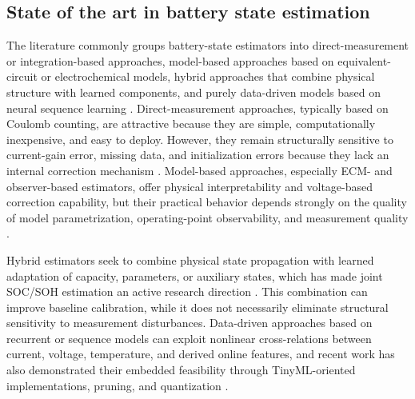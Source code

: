 \documentclass[review,nopreprintline]{elsarticle}
\begin{document}
\subsection{State of the art in battery state estimation}
The literature commonly groups battery-state estimators into direct-measurement or integration-based approaches, model-based approaches based on equivalent-circuit or electrochemical models, hybrid approaches that combine physical structure with learned components, and purely data-driven models based on neural sequence learning \cite{khanComparativeStudyDifferent2022,shrivastavaReviewTechnologicalAdvancement2023,guoSystematicReviewElectrochemical2024,yaoSmarterBatteryManagement2025b}. Direct-measurement approaches, typically based on Coulomb counting, are attractive because they are simple, computationally inexpensive, and easy to deploy. However, they remain structurally sensitive to current-gain error, missing data, and initialization errors because they lack an internal correction mechanism \cite{khanComparativeStudyDifferent2022,liRobustnessSOCEstimation2015}. Model-based approaches, especially ECM- and observer-based estimators, offer physical interpretability and voltage-based correction capability, but their practical behavior depends strongly on the quality of model parametrization, operating-point observability, and measurement quality \cite{gaoEnhancedStateofchargeEstimation2022,guoSystematicReviewElectrochemical2024,liRobustnessSOCEstimation2015}.

Hybrid estimators seek to combine physical state propagation with learned adaptation of capacity, parameters, or auxiliary states, which has made joint SOC/SOH estimation an active research direction \cite{gaoCoEstimationStateofChargeStateof2022,shenAlternativeCombinedCoestimation2022,wangFusionEstimationLithiumion2022}. This combination can improve baseline calibration, while it does not necessarily eliminate structural sensitivity to measurement disturbances. Data-driven approaches based on recurrent or sequence models can exploit nonlinear cross-relations between current, voltage, temperature, and derived online features, and recent work has also demonstrated their embedded feasibility through TinyML-oriented implementations, pruning, and quantization \cite{mondalEstimatingStateofChargeLithiumIon2024,Embedded_AI_only_SOC_mobile,giazitzisCaseStudyTiny2024,mazziStateChargeEstimation2022,yaoSmarterBatteryManagement2025b}.
\end{document}
